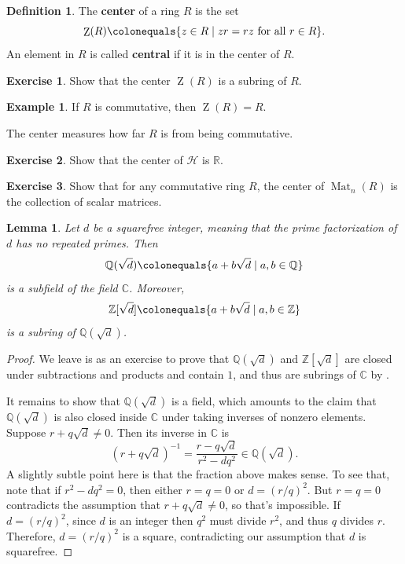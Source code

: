 \documentclass[12pt]{report}
\newtheorem{lemma}[theorem]{Lemma}
\numberwithin{equation}{section}
\numberwithin{theorem}{chapter}
\theoremstyle{definition}
\newtheorem{definition}[theorem]{Definition}
\newtheorem{example}[theorem]{Example}
\newtheorem{exercise}{Exercise}
\newtheorem*{basic properties}{Basic Properties}
\newtheorem*{Important Remark}{Important Remark}
\newcommand{\R}{\mathbb{R}}
\newcommand{\Z}{\mathbb{Z}}
\newcommand{\Q}{\mathbb{Q}}
\newcommand{\C}{\mathbb{C}}
\DeclareMathOperator{\Zc}{Z}
\DeclareMathOperator{\Mat}{Mat}
\begin{document}
\begin{definition}\index{$\Zc(R)$}
The {\bf center} of a ring $R$ is the set
$$\Zc(R) \colonequals \{z \in R \mid zr = rz \text{ for all } r \in R\}.$$
An element in $R$ is called {\bf central} if it is in the center of $R$.
\end{definition}

\begin{exercise}
Show that the center $\Zc(R)$ is a subring of $R$.
\end{exercise}


\begin{example}
	If $R$ is commutative, then $\Zc(R) = R$.
\end{example}

The center measures how far $R$ is from being commutative.

\begin{exercise} 
Show that the center of $\mathcal{H}$ is $\R$.	
\end{exercise}

\begin{exercise}
Show that for any commutative ring $R$, the center of $\Mat_{n}(R)$ is the collection of scalar matrices.
\end{exercise}



\begin{lemma}\label{Z sqrt d}
Let $d$ be a squarefree integer, meaning that the prime factorization of $d$ has no repeated primes. Then 
$$\Q(\sqrt {d}) \colonequals \{a + b\sqrt{d} \mid a,b \in \Q\}$$ 
is a subfield of the field $\C$. Moreover, 
$$\Z[\sqrt{d}] \colonequals \{a + b\sqrt{d} \mid a,b \in \Z\}$$ 
is a subring of $\Q(\sqrt{d})$. 
\end{lemma}


\begin{proof} 
We leave is as an exercise to prove that $\Q(\sqrt {d})$ and $\Z[\sqrt{d}]$ are closed under subtractions and products and contain $1$, and thus are subrings of $\C$ by .

It remains to show that $\Q(\sqrt {d})$ is a field, which amounts to the claim that $\Q(\sqrt {d})$ is also closed inside $\C$ under taking inverses of nonzero elements.
Suppose  $r + q \sqrt{d} \ne 0$. Then its inverse in $\C$ is
$$(r + q \sqrt{d})^{-1} = \frac{r - q \sqrt{d}}{r^2 - d q^2} \in \Q(\sqrt {d}).$$
A slightly subtle point here is that the fraction above makes sense. To see that, note that if $r^2 -d q^2 = 0$, then either $r=q=0$ or $d=(r/q)^2$. But $r=q=0$ contradicts the assumption that $r + q \sqrt{d} \neq 0$, so that's impossible. If $d=(r/q)^2$, since $d$ is an integer then $q^2$ must divide $r^2$, and thus $q$ divides $r$. Therefore, $d = (r/q)^2$ is a square, contradicting our assumption that $d$ is squarefree.
\end{proof}
\end{document}
